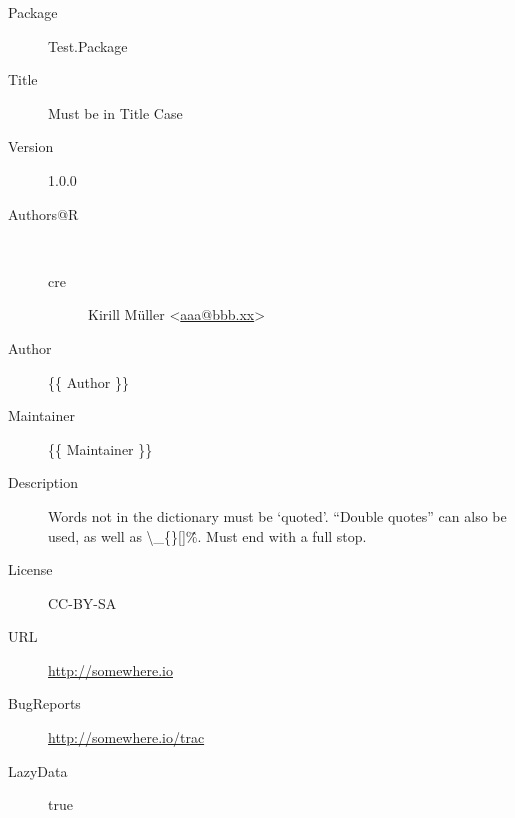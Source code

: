 \begin{description}
  \raggedright{}
  \item[Package] Test.Package
  \item[Title] Must be in Title Case
  \item[Version] 1.0.0
  \item[Authors@R] \\
    \begin{description}
      \item[cre] Kirill Müller <\href{mailto:aaa@bbb.xx}{aaa@bbb.xx}>
    \end{description}
  \item[Author] \{\{ Author \}\}
  \item[Maintainer] \{\{ Maintainer \}\}
  \item[Description] Words not in the dictionary must be `quoted'. ``Double quotes'' can also be used, as well as \textbackslash \_\{\}[]\^\%. Must end with a full stop.
  \item[License] CC-BY-SA
  \item[URL] \url{http://somewhere.io}
  \item[BugReports] \url{http://somewhere.io/trac}
  \item[LazyData] true
\end{description}
